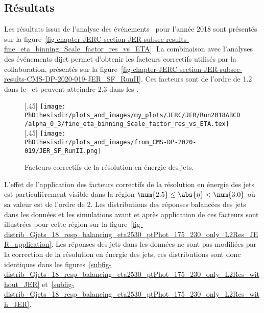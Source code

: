 \subsection{Résultats}\label{chapter-JERC-section-JER-subsec-results}
Les résultats issus de l'analyse des événements \Gjets\ pour l'année 2018 sont présentés sur la figure~\ref{fig-chapter-JERC-section-JER-subsec-results-fine_eta_binning_Scale_factor_res_vs_ETA}.
La combinaison avec l'analyses des événements dijet permet d'obtenir les facteurs correctifs utilisés par la collaboration, présentés sur la figure~\ref{fig-chapter-JERC-section-JER-subsec-results-CMS-DP-2020-019-JER_SF_RunII}.
Ces facteurs sont de l'ordre de \num{1.2} dans le \CMSbarrel\ et peuvent atteindre \num{2.3} dans les \CMSendcaps.
\begin{figure}[h]
\centering
{}[.45\textwidth]
{\texttt{[image: \\PhDthesisdir/plots\_and\_images/my\_plots/JERC/JER/Run2018ABCD/alpha\_0\_3/fine\_eta\_binning\_Scale\_factor\_res\_vs\_ETA.tex]}}
\hfill
{}[.45\textwidth]
{\texttt{[image: \\PhDthesisdir/plots\_and\_images/from\_CMS-DP-2020-019/JER\_SF\_RunII.png]}}

\caption{Facteurs correctifs de la résolution en énergie des jets.}
\end{figure}
\par L'effet de l'application des facteurs correctifs de la résolution en énergie des jets est particulièrement visible dans la région $\num{2.5}\leq\abs{\eta}<\num{3.0}$ où sa valeur est de l'ordre de \num{2}.
Les distributions des réponses balancées des jets dans les données et les simulations avant et après application de ces facteurs sont illustrées pour cette région sur la figure~\ref{fig-distrib_Gjets_18_resp_balancing_eta2530_ptPhot_175_230_only_L2Res_JER_application}.
Les réponses des jets dans les données ne sont pas modifiées par la correction de la résolution en énergie des jets, ces distributions sont donc identiques dans les figures~\ref{subfig-distrib_Gjets_18_resp_balancing_eta2530_ptPhot_175_230_only_L2Res_without_JER} et~\ref{subfig-distrib_Gjets_18_resp_balancing_eta2530_ptPhot_175_230_only_L2Res_with_JER}.

